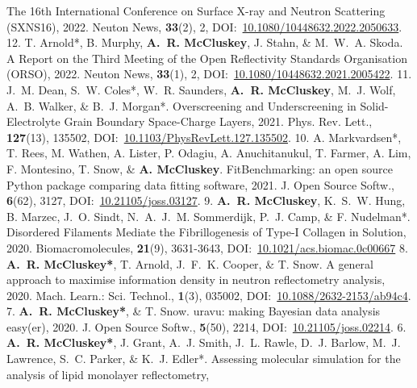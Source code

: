 \begin{cvpubys}
    {The 16th International Conference on Surface X-ray and Neutron Scattering (SXNS16),}
    {2022.}
    {Neuton News,}
    {\textbf{33}(2), 2,}
    {DOI:~\href{https://doi.org/10.1080/10448632.2022.2050633}{10.1080/10448632.2022.2050633}.}
    {12.}
  \cvpuby
    {T. Arnold*, B. Murphy, \textbf{A.~R. McCluskey}, J. Stahn, \& M.~W.~A. Skoda.}
    {A Report on the Third Meeting of the Open Reflectivity Standards Organisation (ORSO),}
    {2022.}
    {Neuton News,}
    {\textbf{33}(1), 2,}
    {DOI:~\href{https://doi.org/10.1080/10448632.2021.2005422}{10.1080/10448632.2021.2005422}.}
    {11.}
  \cvpuby
    {J.~M. Dean, S.~W. Coles*, W.~R. Saunders, \textbf{A.~R. McCluskey}, M.~J. Wolf, A.~B. Walker, \& B.~J. Morgan*.}
    {Overscreening and Underscreening in Solid-Electrolyte Grain Boundary Space-Charge Layers,}
    {2021.}
    {Phys. Rev. Lett.,}
    {\textbf{127}(13), 135502,}
    {DOI:~\href{https://doi.org/10.1103/PhysRevLett.127.135502}{10.1103/PhysRevLett.127.135502}.}
    {10.}
  \cvpuby
    {A. Markvardsen*, T. Rees, M. Wathen, A. Lister, P. Odagiu, A. Anuchitanukul, T. Farmer, A. Lim, F. Montesino, T. Snow, \& \textbf{A. McCluskey}.}
    {FitBenchmarking: an open source Python package comparing data fitting software,}
    {2021.}
    {J. Open Source Softw.,}
    {\textbf{6}(62), 3127,}
    {DOI:~\href{https://doi.org/10.21105/joss.03127}{10.21105/joss.03127}.}
    {9.}
  \cvpuby
    {\textbf{A.~R. McCluskey}, K.~S.~W. Hung, B. Marzec, J.~O. Sindt, N.~A.~J.~M. Sommerdijk, P.~J. Camp, \& F. Nudelman*.}
    {Disordered Filaments Mediate the Fibrillogenesis of Type-I Collagen in Solution,}
    {2020.}
    {Biomacromolecules,}
    {\textbf{21}(9), 3631-3643,}
    {DOI:~\href{https://doi.org/10.1021/acs.biomac.0c00667}{10.1021/acs.biomac.0c00667}}
    {8.}
  \cvpuby
    {\textbf{A.~R. McCluskey*}, T. Arnold, J.~F.~K. Cooper, \& T. Snow.}
    {A general approach to maximise information density in neutron reflectometry analysis,}
    {2020.}
    {Mach. Learn.: Sci. Technol.,}
    {\textbf{1}(3), 035002,}
    {DOI:~\href{https://doi.org/10.1088/2632-2153/ab94c4}{10.1088/2632-2153/ab94c4}.}
    {7.}
  \cvpuby
    {\textbf{A.~R. McCluskey*}, \& T. Snow.}
    {uravu: making Bayesian data analysis easy(er),}
    {2020.}
    {J. Open Source Softw.,}
    {\textbf{5}(50), 2214,}
    {DOI:~\href{https://doi.org/10.21105/joss.02214}{10.21105/joss.02214}.}
    {6.}
  \cvpuby
    {\textbf{A.~R. McCluskey*}, J. Grant, A.~J. Smith, J.~L. Rawle, D.~J. Barlow, M.~J. Lawrence, S.~C. Parker, \& K.~J. Edler*.}
    {Assessing molecular simulation for the analysis of lipid monolayer reflectometry,}

\end{cvpubys}
